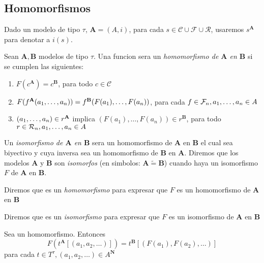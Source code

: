 \subsection{Homomorfismos}
\begin{definition}
  Dado un modelo de tipo $\tau$, $\mathbf{A} = (A, i)$, para cada $s\in\mathcal{C}\cup\mathcal{F}\cup\mathcal{R}$, usaremos $s^\mathbf{A}$
  para denotar a $i(s)$.
\end{definition}

\begin{definition}
  Sean $\mathbf{A}, \mathbf{B}$ modelos de tipo $\tau$. Una funcion  sera un \emph{homomorfismo de $\mathbf{A}$ en $\mathbf{B}$}
  si se cumplen las siguientes: \begin{enumerate}
    \item $F(c^\mathbf{A}) = c^\mathbf{B}$, para todo $c \in \mathcal{C}$
    \item $F(f^\mathbf{A}(a_{1}, \dots, a_{n})) = f^\mathbf{B}(F(a_1), \dots, F(a_n))$, para cada $f \in \mathcal{F}_n, a_{1}, \dots, a_{n} \in A$
    \item $(a_{1}, \dots, a_{n}) \in r^\mathbf{A}$ implica $(F(a_1), \dots, F(a_n)) \in r^\mathbf{B}$, para todo $r \in \mathcal{R}_n, a_{1}, \dots, a_{n}\in A$
  \end{enumerate}

  Un \emph{isomorfismo de $\mathbf{A}$ en $\mathbf{B}$} sera un homomorfismo de $\mathbf{A}$ en $\mathbf{B}$ el cual sea biyectivo y cuya inversa
  sea un homomorfismo de $\mathbf{B}$ en $\mathbf{A}$. Diremos que los modelos $\mathbf{A}$ y $\mathbf{B}$ son \emph{isomorfos} (en simbolos: $\mathbf{A} \tilde{=} \mathbf{B}$) 
  cuando haya un isomorfismo $F$ de $\mathbf{A}$ en $\mathbf{B}$.

  Diremos que  es un \emph{homomorfismo} para expresar que $F$ es un homomorfismo de $\mathbf{A}$ en $\mathbf{B}$

  Diremos que  es un \emph{isomorfismo} para expresar que $F$ es un isomorfismo de $\mathbf{A}$ en $\mathbf{B}$
\end{definition}

\begin{lemma}
  Sea  un homomorfismo. Entonces
  $$
  F(t^\mathbf{A}[(a_1, a_2, \dots)]) = t^\mathbf{B}[(F(a_1), F(a_2), \dots)]
  $$
  para cada $t \in T^\tau, (a_1, a_2, \dots) \in A^\mathbf{N}$
\end{lemma}

